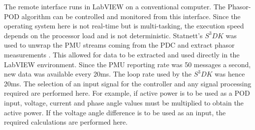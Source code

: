 \documentclass[journal]{IEEEtran}
\begin{document}
The remote interface runs in LabVIEW on a conventional computer. The Phasor-POD algorithm can be controlled and monitored from this interface. Since the operating system here is not real-time but is multi-tasking, the execution speed depends on the processor load and is not deterministic. Statnett's $S^{3}DK$ was used to unwrap the PMU streams coming from the PDC and extract phasor measurements \cite{SDK}. This allowed for data to be extracted and used directly in the LabVIEW environment. Since the PMU reporting rate was 50 messages a second, new data was available every 20ms. The loop rate used by the $S^{3}DK$ was hence 20ms. The selection of an input signal for the controller and any signal processing required are performed here. For example, if active power is to be used as a POD input, voltage, current and phase angle values must be multiplied to obtain the active power. If the voltage angle difference is to be used as an input, the required calculations are performed here.




%
%
\end{document}
